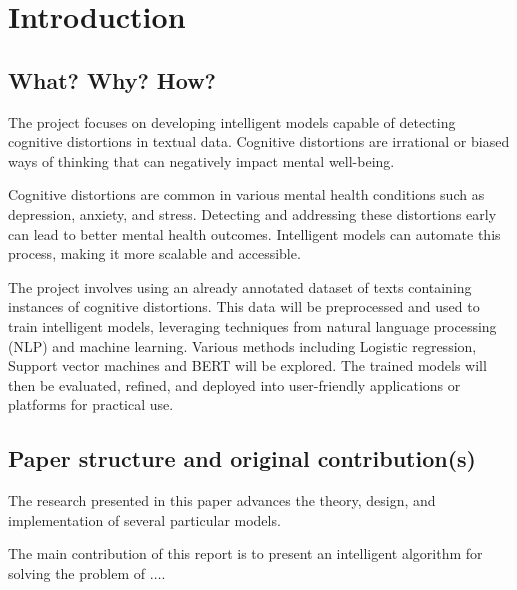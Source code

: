 \documentclass[runningheads,a4paper,11pt]{report}
\begin{document}
\tableofcontents

\newpage

\listoftables
\listoffigures
\listofalgorithms

\newpage




\newpage



\chapter{Introduction}
\label{chapter:introduction}

\section{What? Why? How?}
\label{section:what}

The project focuses on developing intelligent models capable of detecting cognitive distortions in textual data. Cognitive distortions are irrational or biased ways of thinking that can negatively impact mental well-being.

Cognitive distortions are common in various mental health conditions such as depression, anxiety, and stress. Detecting and addressing these distortions early can lead to better mental health outcomes. Intelligent models can automate this process, making it more scalable and accessible.

The project involves using an already annotated dataset of texts containing instances of cognitive distortions. This data will be preprocessed and used to train intelligent models, leveraging techniques from natural language processing (NLP) and machine learning. Various methods including Logistic regression, Support vector machines and BERT will be explored. The trained models will then be evaluated, refined, and deployed into user-friendly applications or platforms for practical use.

\section{Paper structure and original contribution(s)}
\label{section:structure}

The research presented in this paper advances the theory, design, and implementation of several particular models. 

The main contribution of this report is to present an intelligent algorithm for solving the problem of $\ldots$.
\end{document}
